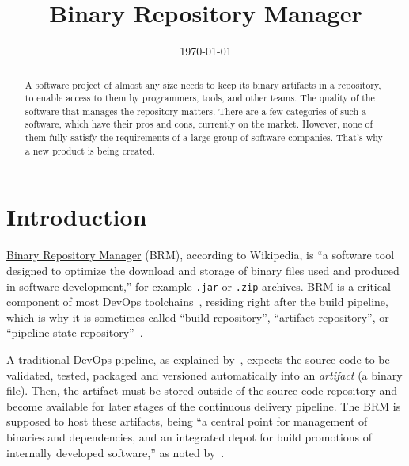 \documentclass[12pt,oneside]{article}
\date{\small\today}
\title{%
  Binary Repository Manager\\
  \colorbox{firebrick}{\small\sffamily\color{white}{White Paper}}}
\newcommand\dd[1]{\colorbox{gray!30}{\texttt{#1}}}
\begin{document}
\raggedbottom

\maketitle
\begin{abstract}
A software project of almost any size needs to keep its binary artifacts
in a repository, to enable access to them by programmers, tools, and other teams.
The quality of the software that manages the repository matters. There are
a few categories of such a software, which have their
pros and cons, currently on the market. However, none of them fully satisfy
the requirements of a large group of software companies.
That's why a new product is being created.
\end{abstract}


\section{Introduction}

\href{https://en.wikipedia.org/wiki/Binary_repository_manager}{Binary Repository Manager}
(BRM), according to Wikipedia, is ``a software tool designed to optimize the download and storage of
binary files used and produced in software development,'' for example
\dd{.jar} or \dd{.zip} archives. BRM is a critical component of
most \href{https://en.wikipedia.org/wiki/DevOps_toolchain}{DevOps toolchains}~\parencite{erich2018},
residing right after the build pipeline, which is why it is sometimes
called ``build repository'', ``artifact repository'', or ``pipeline state repository''~\parencite{bass15}.

A traditional DevOps pipeline, as explained by~\textcite{humble2010}, expects
the source code to be validated, tested, packaged and versioned automatically
into an \emph{artifact} (a binary file).
Then, the artifact must be stored outside of the source
code repository and become available for later stages of the continuous
delivery pipeline. The BRM is supposed to host these artifacts,
being ``a central point for management of binaries and dependencies,
and an integrated depot for build promotions of internally developed software,''
as noted by~\textcite{davis2016}.
\end{document}
